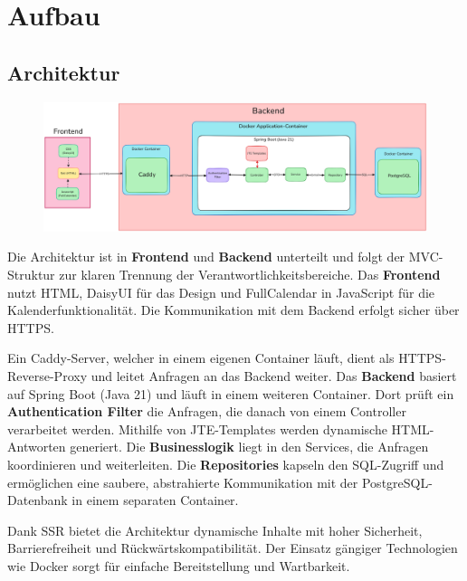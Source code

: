 
\chapter{Aufbau}
\label{ch:aufbau}

\section{Architektur}
\begin{figure}[ht]
    \centering
    \includegraphics[width=\textwidth]{figures/architecture}
    \label{fig:architekturmodell}
\end{figure}
Die Architektur ist in \textbf{Frontend} und \textbf{Backend} unterteilt und folgt der \gls{MVC-Struktur} zur klaren Trennung der Verantwortlichkeitsbereiche.
Das \textbf{Frontend} nutzt \gls{HTML}, \gls{DaisyUI} für das Design und \gls{FullCalendar} in \gls{JavaScript} für die Kalenderfunktionalität.
Die Kommunikation mit dem Backend erfolgt sicher über \gls{HTTPS}.

Ein \gls{Caddy}-Server, welcher in einem eigenen \gls{Container} läuft, dient als \gls{HTTPS-Reverse-Proxy} und leitet Anfragen an das Backend weiter.
Das \textbf{Backend} basiert auf \gls{Spring Boot} (Java 21) und läuft in einem weiteren \gls{Container}.
Dort prüft ein \textbf{Authentication Filter} die Anfragen, die danach von einem \gls{Controller} verarbeitet werden.
Mithilfe von \gls{JTE}-Templates werden dynamische HTML-Antworten generiert.
Die \textbf{Businesslogik} liegt in den \gls{Services}, die Anfragen koordinieren und weiterleiten.
Die \textbf{Repositories} kapseln den SQL-Zugriff und ermöglichen eine saubere, abstrahierte Kommunikation
mit der \gls{PostgreSQL}-Datenbank in einem separaten \gls{Container}.

Dank \gls{SSR} bietet die Architektur dynamische Inhalte mit hoher Sicherheit, Barrierefreiheit und Rückwärtskompatibilität.
Der Einsatz gängiger Technologien wie \gls{Docker} sorgt für einfache Bereitstellung und Wartbarkeit.
\clearpage

